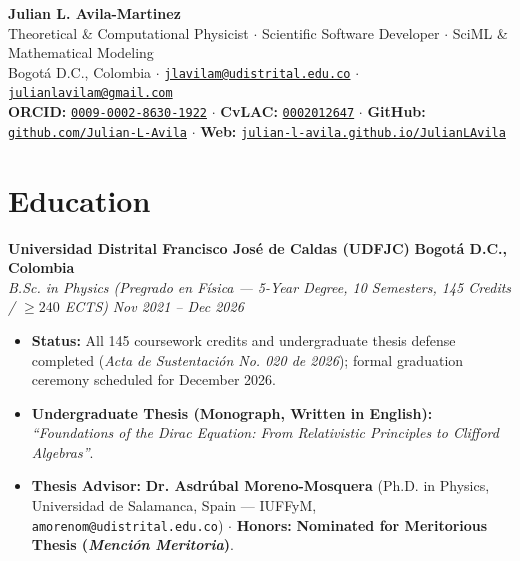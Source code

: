 \documentclass[10pt,a4paper]{article}
\begin{document}
\begin{center}
  {\LARGE \textbf{\color{primary} Julian L. Avila-Martinez}}\\[3pt]
  {\small Theoretical \& Computational Physicist $\cdot$ Scientific Software Developer $\cdot$ SciML \& Mathematical Modeling}\\[3pt]
  {\footnotesize
    Bogot\'a D.C., Colombia $\cdot$
    \href{mailto:jlavilam@udistrital.edu.co}{\texttt{jlavilam@udistrital.edu.co}} $\cdot$
    \href{mailto:julianlavilam@gmail.com}{\texttt{julianlavilam@gmail.com}}
  }\\[2pt]
  {\footnotesize
    \textbf{ORCID:} \href{https://orcid.org/0009-0002-8630-1922}{\texttt{0009-0002-8630-1922}} $\cdot$
    \textbf{CvLAC:} \href{https://scienti.minciencias.gov.co/cvlac/visualizador/generarCurriculoCv.do?cod_rh=0002012647}{\texttt{0002012647}} $\cdot$
    \textbf{GitHub:} \href{https://github.com/Julian-L-Avila}{\texttt{github.com/Julian-L-Avila}} $\cdot$
    \textbf{Web:} \href{https://julian-l-avila.github.io/JulianLAvila/}{\texttt{julian-l-avila.github.io/JulianLAvila}}
  }
\end{center}

\section{Education}

\textbf{Universidad Distrital Francisco Jos\'e de Caldas (UDFJC)} \hfill \textbf{Bogot\'a D.C., Colombia}\\
\textit{B.Sc. in Physics (Pregrado en F\'isica --- 5-Year Degree, 10 Semesters, 145 Credits / $\ge 240$ ECTS)} \hfill \textit{Nov 2021 -- Dec 2026}
\begin{itemize}
  \item \textbf{Status:} All 145 coursework credits and undergraduate thesis defense completed (\textit{Acta de Sustentaci\'on No. 020 de 2026}); formal graduation ceremony scheduled for December 2026.
  \item \textbf{Undergraduate Thesis (Monograph, Written in English):} \textit{``Foundations of the Dirac Equation: From Relativistic Principles to Clifford Algebras''}.
  \item \textbf{Thesis Advisor:} \textbf{Dr. Asdr\'ubal Moreno-Mosquera} (Ph.D. in Physics, Universidad de Salamanca, Spain --- IUFFyM, \texttt{amorenom@udistrital.edu.co}) $\cdot$ \textbf{Honors:} \textbf{Nominated for Meritorious Thesis (\textit{Menci\'on Meritoria})}.
\end{itemize}
\end{document}
